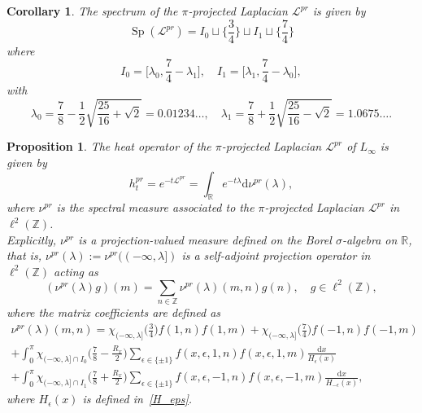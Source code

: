\documentclass[11pt]{amsart}
\newcommand{\Z}{\mathbb{Z}}
\newcommand{\R}{\mathbb{R}}
\theoremstyle{definition}
\theoremstyle{remark}
\theoremstyle{plain}
\newtheorem{proposition}{Proposition}
\newtheorem{corollary}{Corollary}
\numberwithin{equation}{section}
\numberwithin{lemma}{section}
\numberwithin{definition}{section}
\numberwithin{proposition}{section}
\numberwithin{corollary}{section}
\numberwithin{theorem}{section}
\numberwithin{remark}{section}
\begin{document}
\begin{corollary}
 The spectrum of the $\pi$-projected Laplacian $\mathcal{L}^{pr}$ is given by
$$
\operatorname{Sp}(\mathcal{L}^{pr})= I_0 \sqcup\Big\{\frac{3}{4}\Big\}\sqcup I_1 \sqcup\Big\{\frac{7}{4}\Big\}
$$ 
where 
$$
I_0=\Big[\lambda_0,\frac74-\lambda_1\Big], \quad I_1=\Big[\lambda_1,\frac74-\lambda_0\Big],
$$
with
$$
\lambda_0=\frac78-\frac12\sqrt{\frac{25}{16}+\sqrt{2}}=0.01234\dots,\quad \lambda_1=\frac78+\frac12\sqrt{\frac{25}{16}-\sqrt{2}}=1.0675\dots.
$$
\end{corollary}

\begin{proposition} \label{prop:hk_proj}
The heat operator of the $\pi$-projected Laplacian $\mathcal{L}^{pr}$ of $L_\infty$ is given by 
 $$
 h_t^{pr}=e^{-t\mathcal{L}^{pr}}=\int_{\R} e^{-t\lambda} \mathrm{d}\nu^{pr}(\lambda),
 $$
 where $\nu^{pr}$ is the spectral measure associated to the $\pi$-projected Laplacian $\mathcal{L}^{pr}$ in $\ell^2(\Z)$. 
 \\
 Explicitly, $\nu^{pr}$ is a projection-valued measure defined on the Borel $\sigma$-algebra on $\R$, that is, $\nu^{pr}(\lambda):=\nu^{pr}((-\infty,\lambda])$ is a self-adjoint projection operator in $\ell^2(\Z)$ acting as 
 $$
 (\nu^{pr}(\lambda)g)(m)=\sum_{n\in \Z} \nu^{pr}(\lambda)(m,n)g(n), \quad g\in \ell^2(\Z),
 $$
 where the matrix coefficients are defined as 
\begin{multline}\label{proj_val_nu}
\nu^{pr}(\lambda)(m,n) =  \chi_{(-\infty,\lambda]} \Big(\frac 34 \Big) f(1,n) f(1,m) + \chi_{(-\infty,\lambda]} \Big(\frac 74 \Big) f(-1,n) f(-1,m) \\
   + \int_0^\pi \chi_{(-\infty,\lambda]\cap I_0} \Big( \frac{7}{8}-\frac{R_x}{2} \Big) \sum_{\epsilon\in\{\pm1\}} f(x,\epsilon,1,n) f(x,\epsilon,1,m) \frac{\mathrm{d}x}{H_{\epsilon}(x)} \\
 + \int_0^\pi \chi_{(-\infty,\lambda]\cap I_1} \Big( \frac{7}{8}+\frac{R_x}{2} \Big) \sum_{\epsilon\in\{\pm1\}} f(x,\epsilon,-1,n) f(x,\epsilon,-1,m) \frac{\mathrm{d}x}{H_{-\epsilon}(x)},
\end{multline}
where $H_\epsilon(x)$ is defined in~\eqref{H_eps}.
\end{proposition}
\end{document}
